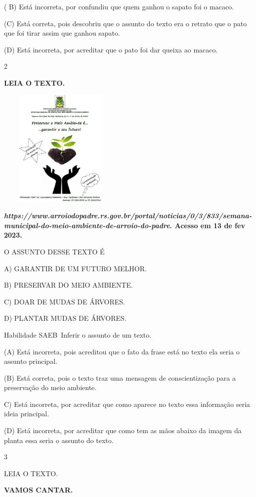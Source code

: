 \begin{escola}
( B) Está incorreta, por confundiu que quem ganhou o sapato foi o
macaco.

(C) Está correta, pois descobriu que o assunto do texto era o retrato
que o pato que foi tirar assim que ganhou sapato.

(D) Está incorreta, por acreditar que o pato foi dar queixa ao macaco.

\num{2}

\textbf{LEIA O TEXTO.}

\includegraphics[width=2.37500in,height=2.25000in]{media/image166.jpg}

\textbf{\emph{https://www.arroiodopadre.rs.gov.br/portal/noticias/0/3/833/semana-municipal-do-meio-ambiente-de-arroio-do-padre}.
Acesso em 13 de fev 2023.}

O ASSUNTO DESSE TEXTO É

A) GARANTIR DE UM FUTURO MELHOR.

B) PRESERVAR DO MEIO AMBIENTE.

C) DOAR DE MUDAS DE ÁRVORES.

D) PLANTAR MUDAS DE ÁRVORES.

\protect\hypertarget{_heading=h.qsh70q}{}{}Habilidade SAEB~Inferir o
assunto de um texto.

(A) Está incorreta, pois acreditou que o fato da frase está no texto ela
seria o assunto principal.

(B) Está correta, pois o texto traz uma mensagem de conscientização para
a preservação do meio ambiente.

C) Está incorreta, por acreditar que como aparece no texto essa
informação seria ideia principal.

(D) Está incorreta, por acreditar que como tem as mãos abaixo da imagem
da planta essa seria o assunto do texto.

\num{3}

LEIA O TEXTO.

\textbf{VAMOS CANTAR.}


\end{escola}
